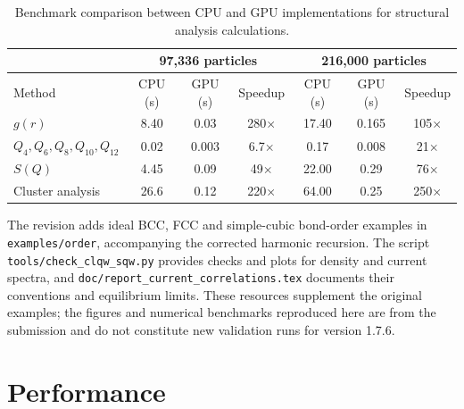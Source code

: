 \documentclass[final,1p,times]{elsarticle}
\begin{document}
\begin{table}[htbp]
\centering
\caption{Benchmark comparison between CPU and GPU implementations for structural analysis calculations.\label{bench}}
\begin{tabular}{lcccccc}
\toprule
& \multicolumn{3}{c}{97,336 particles} & \multicolumn{3}{c}{216,000 particles} \\ \midrule

Method & CPU (s) & GPU (s) & Speedup & CPU (s) & GPU (s) & Speedup \\
\midrule
$g(r)$ & 8.40 & 0.03 & 280$\times$ & 17.40 & 0.165 & 105$\times$ \\
$Q_4, Q_6, Q_8, Q_{10}, Q_{12}$ & 0.02 & 0.003 & 6.7$\times$ & 0.17 & 0.008 & 21$\times$ \\
$S(Q)$ & 4.45 & 0.09 & 49$\times$ & 22.00 & 0.29 & 76$\times$ \\
Cluster analysis & 26.6 & 0.12 & 220$\times$ & 64.00 & 0.25 & 250$\times$ \\
\bottomrule
\end{tabular}
\end{table}





The revision adds ideal BCC, FCC and simple-cubic bond-order examples
in \nolinkurl{examples/order}, accompanying the corrected harmonic
recursion. The script \nolinkurl{tools/check_clqw_sqw.py} provides
checks and plots for density and current spectra, and
\nolinkurl{doc/report_current_correlations.tex} documents their
conventions and equilibrium limits. These resources supplement the
original examples; the figures and numerical benchmarks reproduced
here are from the submission and do not constitute new validation
runs for version 1.7.6.

\section{Performance}
\end{document}
